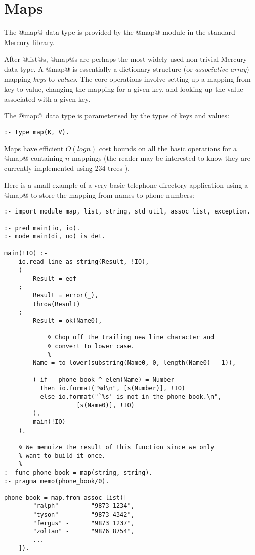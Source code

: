 
\chapter{Maps}

The @map@ data type is provided by the @map@ module in the standard
Mercury library.

After @list@s, @map@s are perhaps the most widely used non-trivial
Mercury data type.  A @map@ is essentially a dictionary structure
(or \emph{associative array})
mapping \emph{keys} to \emph{values}.  The core operations involve
setting up a mapping from key to value, changing the mapping for a
given key, and looking up the value associated with a given key.

The @map@ data type is parameterised by the types of keys and values:
\begin{verbatim}
:- type map(K, V).
\end{verbatim}
Maps have efficient $O(log n)$ cost bounds on all the basic
operations for a @map@ containing $n$ mappings (the reader may be
interested to know they are currently implemented using 234-trees
).

Here is a small example of a very basic telephone directory
application using a @map@ to store the mapping from names to
phone numbers:
\begin{verbatim}
:- import_module map, list, string, std_util, assoc_list, exception.

:- pred main(io, io).
:- mode main(di, uo) is det.

main(!IO) :-
    io.read_line_as_string(Result, !IO),
    (
        Result = eof
    ;
        Result = error(_),
        throw(Result)
    ;
        Result = ok(Name0),

            % Chop off the trailing new line character and
            % convert to lower case.
            %
        Name = to_lower(substring(Name0, 0, length(Name0) - 1)),

        ( if   phone_book ^ elem(Name) = Number
          then io.format("%d\n", [s(Number)], !IO)
          else io.format("`%s' is not in the phone book.\n",
                    [s(Name0)], !IO)
        ),
        main(!IO)
    ).

    % We memoize the result of this function since we only
    % want to build it once.
    %
:- func phone_book = map(string, string).
:- pragma memo(phone_book/0).

phone_book = map.from_assoc_list([
        "ralph" -       "9873 1234",
        "tyson" -       "9873 4342",
        "fergus" -      "9873 1237",
        "zoltan" -      "9876 8754",
        ...
    ]).
\end{verbatim}

